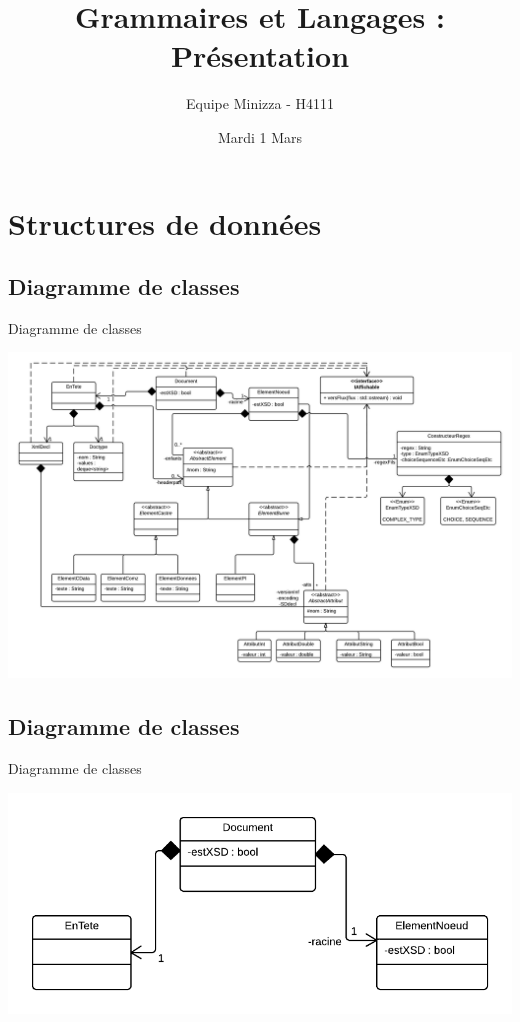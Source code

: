 \documentclass[aspectratio=169]{beamer}
\title[GetL_Presentation]{Grammaires et Langages : Présentation}
\author{Equipe Minizza - H4111}
\institute{INSA de Lyon}
\date{Mardi 1 Mars}
\begin{document}
\begin{frame}
\titlepage
\end{frame}

%


\section{Structures de données}
\subsection{Diagramme de classes}
\begin{frame}{Diagramme de classes}
\begin{center}
 \includegraphics[scale=0.17]{diagdcla}
\end{center}
\end{frame}

\subsection{Diagramme de classes}
\begin{frame}{Diagramme de classes}
\begin{center}
  \includegraphics[scale=0.3]{ddc_doc}
\end{center}
\end{frame}
\end{document}
